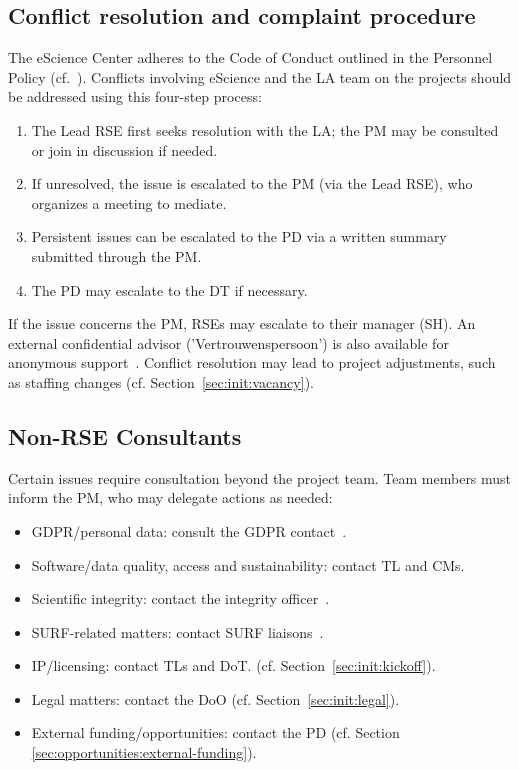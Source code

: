 \subsection{Conflict resolution and complaint procedure}
The eScience Center adheres to the Code of Conduct outlined in the Personnel Policy (cf.~\cite{cao}). 
%
Conflicts involving eScience and the LA team on the projects should be addressed using this four-step process:
\begin{enumerate}\itemsep0em
\item The Lead RSE first seeks resolution with the LA; the PM may be consulted or join in discussion if needed.
\item If unresolved, the issue is escalated to the PM (via the Lead RSE), who organizes a meeting to mediate.
\item Persistent issues can be escalated to the PD via a written summary submitted through the PM.
\item The PD may escalate to the DT if necessary.
\end{enumerate}

If the issue concerns the PM, RSEs may escalate to their manager (SH). An external confidential advisor ('Vertrouwenspersoon') is also available for anonymous support~\cite{intranet}. 
Conflict resolution may lead to project adjustments, such as staffing changes (cf. Section~\ref{sec:init:vacancy}).

\subsection{Non-RSE Consultants}
\label{sec:exec:consult}
Certain issues require consultation beyond the project team. Team members must inform the PM, who may delegate actions as needed:

\begin{itemize}\itemsep0em
\item GDPR/personal data: consult the GDPR contact~\cite{intranet}. 
\item Software/data quality, access and sustainability: contact TL and CMs.
\item Scientific integrity: contact the integrity officer~\cite{intranet}.
\item SURF-related matters: contact SURF liaisons~\cite{intranet}.
\item IP/licensing: contact TLs and DoT. (cf. Section~\ref{sec:init:kickoff}).
\item Legal matters: contact the DoO (cf. Section~\ref{sec:init:legal}).
\item External funding/opportunities: contact the PD (cf. Section \ref{sec:opportunities:external-funding}).
\end{itemize}

